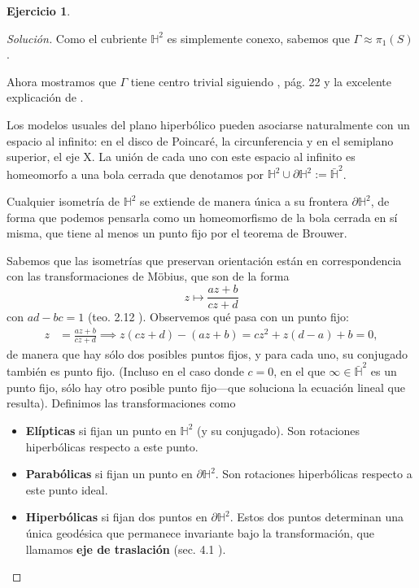 \documentclass[spanish]{article}
\theoremstyle{definition}
\newtheorem*{ejer*}{Ejercicio}
\newcommand{\Hy}{\mathbb{H}}
\begin{document}
\begin{ejer*}
\begin{proof}[Solución]
			Como el cubriente $\Hy^2$ es simplemente conexo, sabemos que $\Gamma\approx\pi_1(S)$.
			
			\vspace{.5cm}
			

			
			
			Ahora mostramos que $\Gamma$ tiene centro trivial siguiendo \cite{Margalit}, pág. 22 y la excelente explicación de \cite{stack}.
			
			Los modelos usuales del plano hiperbólico pueden asociarse naturalmente con un espacio al infinito: en el disco de Poincaré, la circunferencia y en el semiplano superior, el eje X. La unión de cada uno con este espacio al infinito es homeomorfo a una bola cerrada que denotamos por $\Hy^2\cup\partial\Hy^2:=\bar{\Hy}^2$.
			
			Cualquier isometría de $\Hy^2$ se extiende de manera única a su frontera $\partial\Hy^2$, de forma que podemos pensarla como un homeomorfismo de la bola cerrada en sí misma, que tiene al menos un punto fijo por el teorema de Brouwer.
			
			Sabemos que las isometrías que preservan orientación están en correspondencia con las transformaciones de Möbius, que son de la forma
			\[z\mapsto\frac{az+b}{cz+d}\]
			con $ad-bc=1$ (teo. 2.12 \cite{Vinberg-1}).
			Observemos qué pasa con un punto fijo:
			\begin{align*}
				z&=\frac{az+b}{cz+d}\implies z(cz+d)-(az+b)=cz^2+z(d-a)+b=0,
			\end{align*}
			de manera que hay sólo dos posibles puntos fijos, y para cada uno, su conjugado también es punto fijo. (Incluso en el caso donde $c=0$, en el que $\infty\in\bar{\Hy}^2$ es un punto fijo, sólo hay otro posible punto fijo---que soluciona la ecuación lineal que resulta). Definimos las transformaciones como
			\begin{itemize}
				\item \textbf{Elípticas} si fijan un punto en $\Hy^2$ (y su conjugado). Son rotaciones hiperbólicas respecto a este punto.
				\item \textbf{Parabólicas} si fijan un punto en $\partial\Hy^2$. Son rotaciones hiperbólicas respecto a este punto ideal.
				\item \textbf{Hiperbólicas} si fijan dos puntos en $\partial\Hy^2$. Estos dos puntos determinan una única geodésica que permanece invariante bajo la transformación, que llamamos \textbf{eje de traslación} (sec. 4.1 \cite{Vinberg-1}).
			\end{itemize}


\end{proof}
\end{ejer*}
\end{document}
